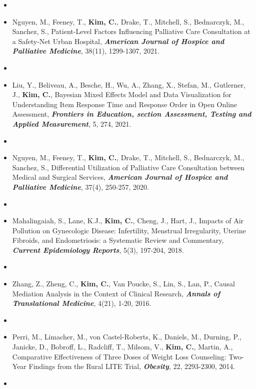 \documentclass[10pt]{article}
\newenvironment{innerlist}[1][\enskip\textbullet]%
        {\begin{itemize}[#1,leftmargin=*,parsep=0pt,itemsep=0pt,topsep=0pt,partopsep=0pt]}
        {\end{itemize}}
\begin{document}
\begin{innerlist}
\item[]
        \item[] Nguyen, M., Feeney, T., {\bf Kim, C.}, Drake, T., Mitchell, S., Bednarczyk, M., Sanchez, S.,  
Patient-Level Factors Influencing Palliative Care Consultation at a Safety-Net Urban Hospital,  \textbf {\textit{American Journal of Hospice and Palliative Medicine}}, 38(11), 1299-1307, 2021.
\item[]
  \item[] Liu, Y., Beliveau, A., Besche, H.,  Wu, A., Zhang, X.,  Stefan, M., Gutlerner, J., {\bf Kim, C.},
Bayesian Mixed Effects Model and Data Visualization for Understanding Item Response Time and Response Order in Open Online Assessment, \textbf {\textit{Frontiers in Education, section Assessment, Testing and Applied Measurement}}, 5, 274, 2021.
\item[]
        \item[] Nguyen, M., Feeney, T., {\bf Kim, C.}, Drake, T., Mitchell, S., Bednarczyk, M., Sanchez, S.,  
Differential Utilization of Palliative Care Consultation between Medical and Surgical Services,  \textbf {\textit{American Journal of Hospice and Palliative Medicine}}, 37(4), 250-257, 2020.
\item[]
\item[] Mahalingaiah, S., Lane, K.J., {\bf Kim, C.}, Cheng, J., Hart, J., Impacts of Air Pollution on Gynecologic Disease: Infertility, Menstrual Irregularity, Uterine Fibroids, and Endometriosis: a Systematic Review and Commentary, \textbf {\textit{Current Epidemiology Reports}}, 5(3), 197-204, 2018.
        \item[]
\item[] Zhang, Z., Zheng, C., {\bf Kim, C.}, Van Poucke, S., Lin, S., Lan, P., Causal Mediation Analysis in the Context of Clinical Research, \textbf {\textit{Annals of Translational Medicine}}, 4(21), 1-20, 2016.
        \item[]
  \item[] Perri, M., Limacher, M., von Castel-Roberts, K., Daniels, M., Durning, P., Janicke, D.,
Bobroff, L., Radcliff, T., Milsom, V., {\bf Kim, C.}, Martin, A., 
    Comparative Effectiveness of Three Doses of Weight
      Loss Counseling: Two-Year Findings from the Rural LITE Trial,
    \textbf {\textit{ Obesity}}, 22, 2293-2300, 2014.
    \item[]
\end{innerlist}
\bigskip
\end{document}
